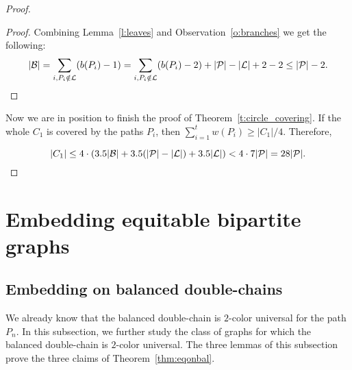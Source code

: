 \documentclass[12pt]{article}
\begin{document}
\begin{proof}
\begin{proof}
Combining Lemma~\ref{l:leaves} and Observation~\ref{o:branches} we get the following:
$$ |{\cal B}| = \sum_{i, P_i \notin {\cal L}} (b(P_i)-1)= \sum_{i, P_i \notin {\cal L}} (b(P_i)-2)+ |{\cal P}|-|{\cal L}| + 2 - 2 \leq |{\cal P}|-2.$$
\end{proof}
\bigskip

Now we are in position to finish the proof of Theorem~\ref{t:circle_covering}.
If the whole $C_1$ is covered by the paths $P_i$, then $\sum_{i=1}^t w(P_i) \geq |C_1|/4$. Therefore,

$$|C_1| \leq 4\cdot(3.5|{\cal B}|+3.5(|{\cal P}|-|{\cal L}|)+ 3.5|{\cal L}|) < 4\cdot7|{\cal P}| = 28 |{\cal P}|.$$
\end{proof}






\section{Embedding equitable bipartite graphs}
\label{sec:emb}
\subsection{Embedding on balanced double-chains}
We already know that the balanced double-chain is $2$-color universal for the path $P_n$. 
In this subsection, we further study the class of graphs for which the balanced double-chain 
is $2$-color universal. The three lemmas of this subsection prove the three claims of 
Theorem~\ref{thm:eqonbal}.
\end{document}
